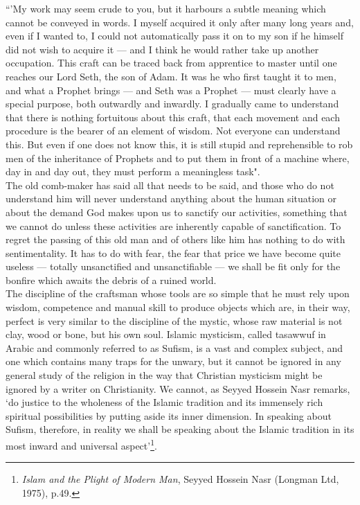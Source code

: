 \documentclass[10pt, twoside]{book}
\begin{document}
``'My work may seem crude to you, but it harbours a subtle meaning which cannot be conveyed in words. 
I myself acquired it only after many long years and, even if I wanted to, I could not automatically 
pass it on to my son if he himself did not wish to acquire it --- and I think he would rather take up 
another occupation. This craft can be traced back from apprentice to master until one reaches our 
Lord Seth, the son of Adam. It was he who first taught it to men, and what a Prophet brings --- and 
Seth was a Prophet --- must clearly have a special purpose, both outwardly and inwardly. I gradually 
came to understand that there is nothing fortuitous about this craft, that each movement and each 
procedure is the bearer of an element of wisdom. Not everyone can understand this. But even if one 
does not know this, it is still stupid and reprehensible to rob men of the inheritance of Prophets 
and to put them in front of a machine where, day in and day out, they must perform a meaningless 
task". \\ 


The old comb\hyp{}maker has said all that needs to be said, and those who do not understand him will never 
understand anything about the human situation or about the demand God makes upon us to sanctify our 
activities, something that we cannot do unless these activities are inherently capable of 
sanctification. To regret the passing of this old man and of others like him has nothing to do with 
sentimentality. It has to do with fear, the fear that price we have become quite useless --- totally 
unsanctified and unsanctifiable --- we shall be fit only for the bonfire which awaits the debris of a 
ruined world. \\

The discipline of the craftsman whose tools are so simple that he must rely upon wisdom, competence 
and manual skill to produce objects which are, in their way, perfect is very similar to the 
discipline of the mystic, whose raw material is not clay, wood or bone, but his own soul. Islamic 
mysticism, called tasawwuf in Arabic and commonly referred to as Sufism, is a vast and complex 
subject, and one which contains many traps for the unwary, but it cannot be ignored in any general 
study of the religion in the way that Christian mysticism might be ignored by a writer on 
Christianity. We cannot, as Seyyed Hossein Nasr remarks, `do justice to the wholeness of the Islamic 
tradition and its immensely rich spiritual possibilities by putting aside its inner dimension. In 
speaking about Sufism, therefore, in reality we shall be speaking about the Islamic tradition in its 
most inward and universal aspect'\footnote{\emph{Islam and the Plight of Modern Man}, Seyyed Hossein Nasr (Longman Ltd, 1975), p.49.}. \\
\end{document}
